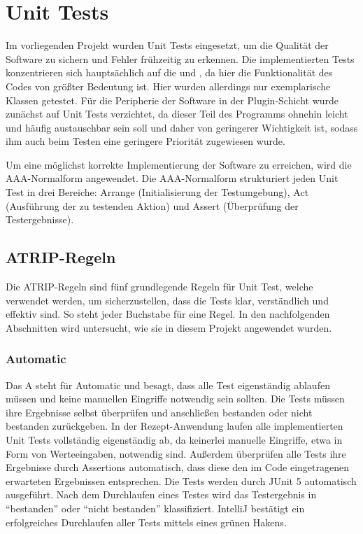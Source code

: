\chapter{Unit Tests}

Im vorliegenden Projekt wurden Unit Tests eingesetzt, um die Qualität der Software zu sichern und Fehler frühzeitig zu erkennen. Die implementierten Tests konzentrieren sich hauptsächlich auf die \href{https://github.com/MichaelaHaag/RezeptApp/blob/main/3-Domain-Code/src/test/java/de/rezeptapp/domain/Rezept}{} und \href{https://github.com/MichaelaHaag/RezeptApp/tree/main/1-Adapter/src/test/java/de/rezeptapp/adapter/Datenpersistenz}{}, da hier die Funktionalität des Codes von größter Bedeutung ist. Hier wurden allerdings nur exemplarische Klassen getestet. Für die Peripherie der Software in der Plugin-Schicht wurde zunächst auf Unit Tests verzichtet, da dieser Teil des Programms ohnehin leicht und häufig austauschbar sein soll und daher von geringerer Wichtigkeit ist, sodass ihm auch beim Testen eine geringere Priorität zugewiesen wurde.                              

Um eine möglichst korrekte Implementierung der Software zu erreichen, wird die AAA-Normalform angewendet. Die AAA-Normalform strukturiert jeden Unit Test in drei Bereiche: Arrange (Initialisierung der Testumgebung), Act (Ausführung der zu testenden Aktion) und Assert (Überprüfung der Testergebnisse).

\section{ATRIP-Regeln}

Die ATRIP-Regeln sind fünf grundlegende Regeln für Unit Test, welche verwendet werden, um sicherzustellen, dass die Tests klar, verständlich und effektiv sind. So steht jeder Buchstabe für eine Regel. In den nachfolgenden Abschnitten wird untersucht, wie sie in diesem Projekt angewendet wurden.

\subsection{Automatic}
Das A steht für Automatic und besagt, dass alle Test eigenständig ablaufen müssen und keine manuellen Eingriffe notwendig sein sollten. Die Tests müssen ihre Ergebnisse selbst überprüfen und anschließen bestanden oder nicht bestanden zurückgeben. In der Rezept-Anwendung laufen alle implementierten Unit Tests vollständig eigenständig ab, da keinerlei manuelle Eingriffe, etwa in Form von Werteeingaben, notwendig sind. Außerdem überprüfen alle Tests ihre Ergebnisse durch Assertions automatisch, dass diese den im Code eingetragenen erwarteten Ergebnissen entsprechen. Die Tests werden durch JUnit 5 automatisch ausgeführt. Nach dem Durchlaufen eines Testes wird das Testergebnis in \enquote{bestanden} oder \enquote{nicht bestanden} klassifiziert. IntelliJ bestätigt ein erfolgreiches Durchlaufen aller Tests mittels eines grünen Hakens.

